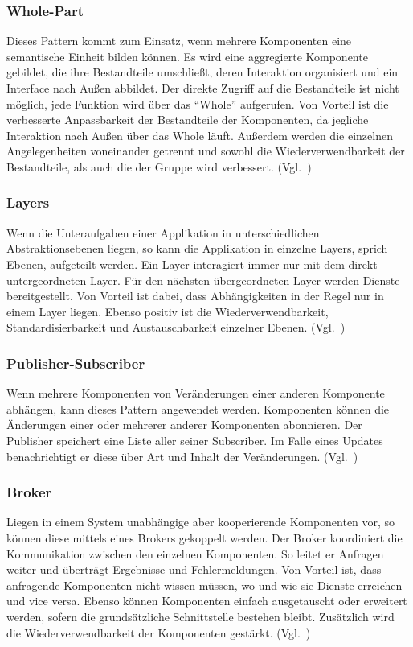 \subsubsection{Whole-Part}
Dieses Pattern kommt zum Einsatz, wenn mehrere Komponenten eine semantische Einheit bilden können.
Es wird eine aggregierte Komponente gebildet, die ihre Bestandteile umschließt, deren Interaktion organisiert und ein Interface nach Außen abbildet.
Der direkte Zugriff auf die Bestandteile ist nicht möglich, jede Funktion wird über das \enquote{Whole} aufgerufen.
Von Vorteil ist die verbesserte Anpassbarkeit der Bestandteile der Komponenten, da jegliche Interaktion nach Außen über das Whole läuft.
Außerdem werden die einzelnen Angelegenheiten voneinander getrennt und sowohl die Wiederverwendbarkeit der Bestandteile, als auch die der Gruppe wird verbessert.
(Vgl.~\cite{buschmann-pattern-oriented-software-architecture})

\subsubsection{Layers}
Wenn die Unteraufgaben einer Applikation in unterschiedlichen Abstraktionsebenen liegen, so kann die Applikation in einzelne Layers, sprich Ebenen, aufgeteilt werden.
Ein Layer interagiert immer nur mit dem direkt untergeordneten Layer.
Für den nächsten übergeordneten Layer werden Dienste bereitgestellt.
Von Vorteil ist dabei, dass Abhängigkeiten in der Regel nur in einem Layer liegen.
Ebenso positiv ist die Wiederverwendbarkeit, Standardisierbarkeit und Austauschbarkeit einzelner Ebenen.
(Vgl.~\cite{buschmann-pattern-oriented-software-architecture})

\subsubsection{Publisher-Subscriber}
Wenn mehrere Komponenten von Veränderungen einer anderen Komponente abhängen, kann dieses Pattern angewendet werden.
Komponenten können die Änderungen einer oder mehrerer anderer Komponenten abonnieren.
Der Publisher speichert eine Liste aller seiner Subscriber.
Im Falle eines Updates benachrichtigt er diese über Art und Inhalt der Veränderungen.
(Vgl.~\cite{buschmann-pattern-oriented-software-architecture})

\subsubsection{Broker}
Liegen in einem System unabhängige aber kooperierende Komponenten vor, so können diese mittels eines Brokers gekoppelt werden.
Der Broker koordiniert die Kommunikation zwischen den einzelnen Komponenten.
So leitet er Anfragen weiter und überträgt Ergebnisse und Fehlermeldungen.
Von Vorteil ist, dass anfragende Komponenten nicht wissen müssen, wo und wie sie Dienste erreichen und vice versa.
Ebenso können Komponenten einfach ausgetauscht oder erweitert werden, sofern die grundsätzliche Schnittstelle bestehen bleibt.
Zusätzlich wird die Wiederverwendbarkeit der Komponenten gestärkt.
(Vgl.~\cite{buschmann-pattern-oriented-software-architecture})

